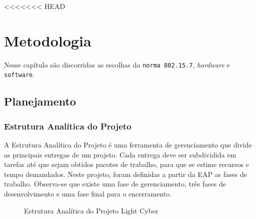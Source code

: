<<<<<<< HEAD
	\chapter{Metodologia}\label{cap-metodologia}
	
	Nesse capítulo são discorridas as escolhas da \texttt{norma 802.15.7}, \textit{hardware} e \texttt{software}.
	
	\section{Planejamento}\label{sec-planejamento}
	
	\subsection{Estrutura Analítica do Projeto}\label{subsec-eap}
	
	A Estrutura Analítica do Projeto é uma ferramenta de gerenciamento que divide as principais entregas de um projeto. Cada entrega deve ser subdividida em tarefas até que sejam obtidos pacotes de trabalho, para que se estime recursos e tempo demandados. Neste projeto, foram definidas a partir da EAP as fases de trabalho. Observa-se que existe uma fase de gerenciamento, três fases de desenvolvimento e uma fase final para o encerramento.
	
	
	\begin{figure}[h!]
		\caption{\label{fig_eap} Estrutura Analítica do Projeto Light Cyber }
		\centering
	\end{figure}
	
